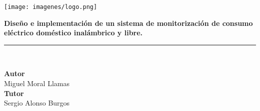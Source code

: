 \begin{titlepage}
 
 
\setlength{\centeroffset}{-0.5\oddsidemargin}
\addtolength{\centeroffset}{0.5\evensidemargin}
\thispagestyle{empty}

\noindent\hspace*{\centeroffset}\begin{minipage}{\textwidth}

\centering

% 

 \vspace{3.3cm}

\texttt{[image: imagenes/logo.png]} 
 \vspace{0.5cm}


{\Huge\bfseries Diseño e implementación de un sistema de monitorización de consumo eléctrico doméstico inalámbrico y libre.\\
}
\noindent\rule[-1ex]{\textwidth}{3pt}\\[3.5ex]
\end{minipage}

\vspace{2.5cm}
\noindent\hspace*{\centeroffset}\begin{minipage}{\textwidth}
\centering

\textbf{Autor}\\ {Miguel Moral Llamas}\\[2.5ex]
\textbf{Tutor}\\
{Sergio Alonso Burgos}\\[2cm]
\end{minipage}

 
\end{titlepage}


